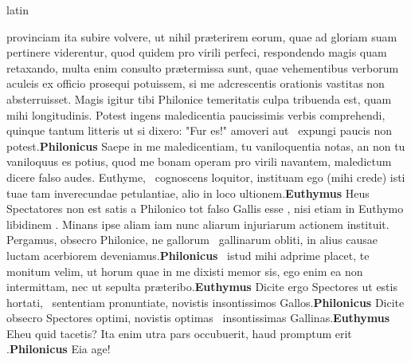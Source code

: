 \documentclass[12pt]{book}
\renewenvironment{latin}
    	{\begin{hyphenrules}{latin}}
    	{\end{hyphenrules}}
\begin{document}
\begin{pages}
\begin{latin}
\begin{Leftside}
            provinciam ita subire volvere, ut nihil præterirem eorum, quae ad gloriam suam pertinere viderentur, quod quidem pro virili perfeci, respondendo
            magis quam retaxando, multa enim consulto prætermissa sunt, quae 
            vehementibus verborum aculeis ex officio prosequi potuissem, si
            me adcrescentis orationis vastitas non absterruisset. 
            Magis igitur tibi Philonice temeritatis culpa tribuenda est, quam mihi longitudinis. 
            Potest ingens maledicentia paucissimis verbis comprehendi, 
            quinque tantum litteris ut si dixero: "Fur es!" amoveri aut ﻿\ampersand\ expungi paucis non potest.\pend\pstart\textbf{Philonicus }\hspace{1cm} Saepe in me maledicentiam, tu vaniloquentia notas, an non tu vaniloquus es potius, quod me bonam 
            operam pro virili navantem, maledictum dicere falso audes. 
            Euthyme, ﻿\ampersand\ cognoscens loquitor, instituam ego (mihi crede) isti tuae tam inverecundae petulantiae, alio in loco ultionem.\pend\pstart\textbf{Euthymus }\hspace{1cm} Heus Spectatores non est satis a Philonico tot falso Gallis esse , 
            nisi etiam in Euthymo libidinem . 
            Minans ipse aliam iam nunc
            aliarum injuriarum actionem instituit. Pergamus, obsecro Philonice, ne gallorum ﻿\ampersand\ gallinarum obliti, in alius causae luctam acerbiorem deveniamus.\pend\pstart\textbf{Philonicus }\hspace{1cm} ﻿\ampersand\ istud mihi adprime placet,  te monitum velim, ut horum quae in me dixisti memor sis, ego enim ea non intermittam, nec ut sepulta præteribo.\pend\pstart\textbf{Euthymus }\hspace{1cm} Dicite ergo Spectores ut estis hortati, ﻿\ampersand\ sententiam pronuntiate, novistis insontissimos Gallos.\pend\pstart\textbf{Philonicus }\hspace{1cm} Dicite obsecro Spectores optimi, novistis optimas ﻿\ampersand\ insontissimas Gallinas.\pend\pstart\textbf{Euthymus }\hspace{1cm} Eheu quid tacetis? 
                    Ita enim utra pars occubuerit, haud promptum erit .\pend\pstart\textbf{Philonicus }\hspace{1cm} Eia age! 

\end{Leftside}
\end{latin}
\end{pages}
\end{document}
